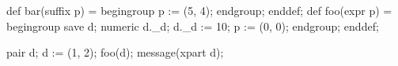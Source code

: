 \usemodule[zhfonts]
  \startMPpage
  def bar(suffix p) =
  begingroup
    p := (5, 4);
  endgroup;
  enddef;
  def foo(expr p) =
    begingroup
      save d; numeric d._d; d._d := 10;
      p := (0, 0);
  endgroup;
enddef;

pair d; d := (1, 2);
foo(d);
    message(xpart d);
%
%
%
\stopMPpage
